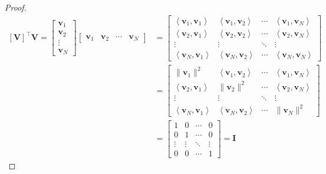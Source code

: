 \documentclass[]{article}
\newcommand{\iprod}[2]{\left\langle #1, #2 \right\rangle}
\newcommand{\tpose}[1]{\left[#1\right]^{\! \top} \!\!}
\begin{document}
\begin{proof}
\begin{align}
	\tpose{\bm{V}} \bm{V} = \begin{bmatrix}
	\bm{v}_1 \\
	\bm{v}_2 \\
	\vdots \\
	\bm{v}_N
	\end{bmatrix}
	\begin{bmatrix}
	\bm{v}_1 & \bm{v}_2 & \cdots & \bm{v}_N
	\end{bmatrix} &= 
	\begin{bmatrix}
	\iprod{\bm{v}_1}{\bm{v}_1} & \iprod{\bm{v}_1}{\bm{v}_2} & \cdots & \iprod{\bm{v}_1}{\bm{v}_N} \\
	\iprod{\bm{v}_2}{\bm{v}_1} & \iprod{\bm{v}_2}{\bm{v}_2} & \cdots & \iprod{\bm{v}_2}{\bm{v}_N} \\
	\vdots & \vdots & \ddots & \vdots \\
	\iprod{\bm{v}_N}{\bm{v}_1} & \iprod{\bm{v}_N}{\bm{v}_2} & \cdots & \iprod{\bm{v}_N}{\bm{v}_N}
	\end{bmatrix} \\
	&= \begin{bmatrix}
	\|\bm{v}_1\|^2 & \iprod{\bm{v}_1}{\bm{v}_2} & \cdots & \iprod{\bm{v}_1}{\bm{v}_N} \\
	\iprod{\bm{v}_2}{\bm{v}_1} & \|\bm{v}_2\|^2 & \cdots & \iprod{\bm{v}_2}{\bm{v}_N} \\
	\vdots & \vdots & \ddots & \vdots \\
	\iprod{\bm{v}_N}{\bm{v}_1} & \iprod{\bm{v}_N}{\bm{v}_2} & \cdots & \|\bm{v}_N\|^2
	\end{bmatrix} \\
	&= \begin{bmatrix}
	1 & 0 & \cdots & 0 \\
	0 & 1 & \cdots & 0 \\
	\vdots & \vdots & \ddots & \vdots \\
	0 & 0 & \cdots & 1
	\end{bmatrix} = \bm{I}
\end{align}
\end{proof}

\subsection{}
\end{document}
